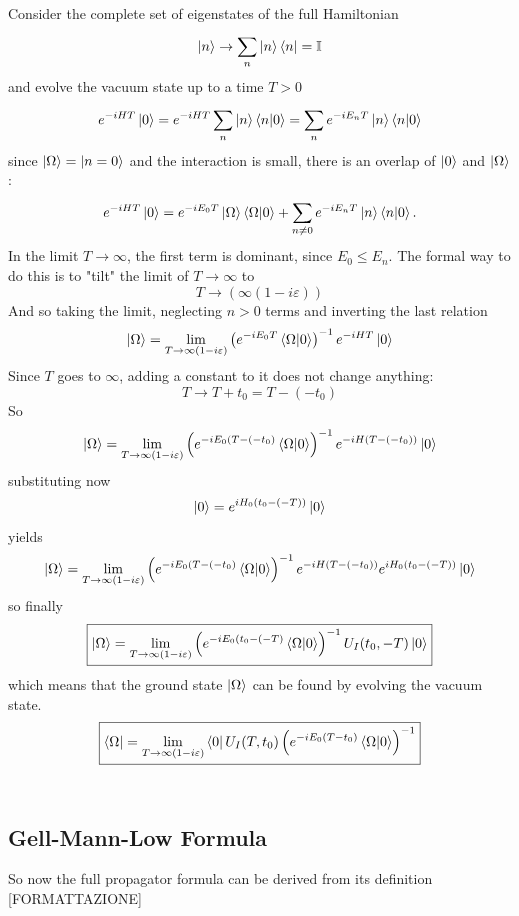 Consider the complete set of eigenstates of the full Hamiltonian
$$\ket{n}\to\sum_{n}^{}\ket{n}\bra{n}=\mathbb{I}$$
and evolve the vacuum state up to a time $T>0$
$$e^{-iHT}\ket{0} = e^{-iHT}\sum_{n}^{}\ket{n}\bra{n}\ket{0}=
\sum_{n}^{}e^{-iE_nT}\ket{n}\bra{n}\ket{0}
$$
since $\ket{\Omega}=\ket{n=0}$ and the interaction is small,
there is an overlap of $\ket{0}$ and $\ket{\Omega}$:
$$e^{-iHT}\ket{0} = e^{-iE_0T}\ket{\Omega}\bra{\Omega}\ket{0} + \sum_{n\neq0}^{}
e^{-iE_nT}\ket{n}\bra{n}\ket{0}.$$
In the limit $T\to\infty$, the first term is dominant, since $E_0\leq E_n$. The
formal way to do this is to "tilt" the limit of $T\to\infty$ to
$$T\to(\infty(1-i\varepsilon))$$
And so taking the limit, neglecting $n>0$ terms and inverting the last relation
$$\ket{\Omega} = \lim\limits_{T\to\infty(1-i\varepsilon)}\left(e^{-iE_0T}\bra{\Omega}
\ket{0}\right)^{-1}e^{-iHT}\ket{0}$$
Since $T$ goes to $\infty$, adding a constant to it does not change anything:
$$T\to T+t_0 = T-(-t_0)$$
So
$$\ket{\Omega} = \lim\limits_{T\to\infty(1-i\varepsilon)}\left(e^{-iE_0(T-(-t_0)}
\bra{\Omega}\ket{0}\right)^{-1}e^{-iH(T-(-t_0))}\ket{0}$$
substituting now
$$\ket{0}=e^{iH_0(t_0-(-T))}\ket{0}$$
yields
$$\ket{\Omega}=\lim\limits_{T\to\infty(1-i\varepsilon)}\left(e^{-iE_0(T-(-t_0)}
\bra{\Omega}\ket{0}\right)^{-1}e^{-iH(T-(-t_0))}e^{iH_0(t_0-(-T))}\ket{0}$$
so finally
$$\boxed{
\ket{\Omega}=\lim\limits_{T\to\infty(1-i\varepsilon)}\left(e^{-iE_0(t_0-(-T)}
\bra{\Omega}\ket{0}\right)^{-1}U_I(t_0,-T)\ket{0}}$$
which means that the ground state $\ket{\Omega}$ can be found by evolving the
vacuum state.
$$\boxed{
\bra{\Omega} = \lim\limits_{T\to\infty(1-i\varepsilon)}\bra{0}U_I(T,t_0)
\left(e^{-iE_0(T-t_0)}
\bra{\Omega}\ket{0}\right)^{-1}
}$$\\

\subsection{Gell-Mann-Low Formula}
So now the full propagator formula can be derived from its definition
[FORMATTAZIONE]

